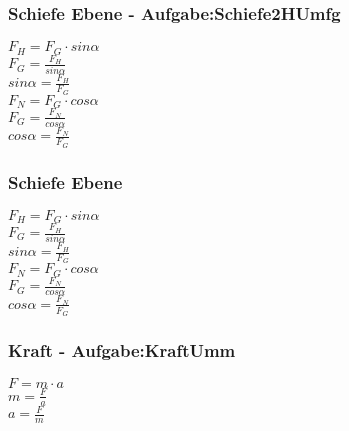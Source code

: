 \subsubsection{Schiefe Ebene - Aufgabe:Schiefe2HUmfg} 
\begin{minipage}{0.45\textwidth} 
$ F_{H}  = F_{G} \cdot sin \alpha $\\ 
$ F_{G}  = \frac{ F_{H} }{sin \alpha } $\\ 
$ sin \alpha  = \frac{F_{H} }{F_{G} } $\\ 
$ F_{N}  = F_{G} \cdot cos \alpha $\\ 
$ F_{G}  = \frac{ F_{N} }{cos \alpha } $\\ 
$ cos \alpha  = \frac{F_{N} }{F_{G} } $\\ 
\end{minipage} 
\begin{minipage}{0.45\textwidth} 
 
\end{minipage} 
\subsubsection{Schiefe Ebene} 
\begin{minipage}{0.45\textwidth} 
$ F_{H}  = F_{G} \cdot sin \alpha $\\ 
$ F_{G}  = \frac{ F_{H} }{sin \alpha } $\\ 
$ sin \alpha  = \frac{F_{H} }{F_{G} } $\\ 
$ F_{N}  = F_{G} \cdot cos \alpha $\\ 
$ F_{G}  = \frac{ F_{N} }{cos \alpha } $\\ 
$ cos \alpha  = \frac{F_{N} }{F_{G} } $\\ 
\end{minipage} 
\begin{minipage}{0.45\textwidth} 
 
\end{minipage} 
\subsubsection{Kraft - Aufgabe:KraftUmm} 
\begin{minipage}{0.45\textwidth} 
$ F = m\cdot a $\\ 
$ m = \frac{F}{a} $\\ 
$ a = \frac{F}{m} $\\ 
\end{minipage} 
\begin{minipage}{0.45\textwidth} 
 
\end{minipage} 
